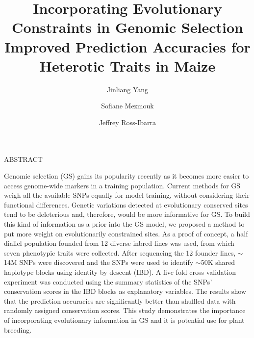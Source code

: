 \documentclass[12pt]{article}
\title{Incorporating Evolutionary Constraints in Genomic Selection Improved Prediction Accuracies for Heterotic Traits in Maize}
\date{}
\author[1]{Jinliang Yang} %
\author[1,2]{Sofiane Mezmouk}
\author[1]{Jeffrey Ross-Ibarra}
\affil[1]{Department of Plant Sciences, University of California, Davis, CA 95616}
\affil[2]{Current address: Institute of sciences, Somewhere, Street of Something}
\newcommand{\smalllineskip}{\baselineskip=15pt}
\renewenvironment{abstract}[0]{\small\rm
        \begin{center}ABSTRACT
        \\ \vspace{8pt}
        \begin{minipage}{5.2in}\smalllineskip
        \hspace{1pc}}{\end{minipage}\end{center}\vspace{-1pt}}
\begin{document}
\maketitle

\begin{abstract}

Genomic selection (GS) gains its popularity recently as it becomes more easier to access genome-wide markers in a training population. Current methods for GS weigh all the available SNPs equally for model training, without considering their functional differences. Genetic variations detected at evolutionary conserved sites tend to be deleterious and, therefore, would be more informative for GS. To build this kind of information as a prior into the GS model, we proposed a method to put more weight on evolutionarily constrained sites. As a proof of concept, a half diallel population founded from 12 diverse inbred lines was used, from which seven phenotypic traits were collected. After sequencing the 12 founder lines, $\sim$14M SNPs were discovered and the SNPs were used to identify $\sim$50K shared haplotype blocks using identity by descent (IBD). A five-fold cross-validation experiment was conducted using the summary statistics of the SNPs' conservation scores in the IBD blocks as explanatory variables. The results show that the prediction accuracies are significantly better than shuffled data with randomly assigned conservation scores. This study demonstrates the importance of incorporating evolutionary information in GS and it is potential use for plant breeding.

\end{abstract}
\end{document}

